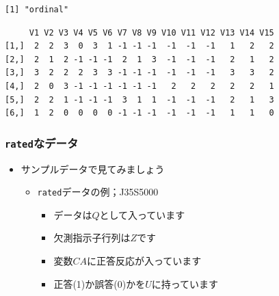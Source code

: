 \documentclass[
  a4paper,
]{ltjsbook}
\newenvironment{Shaded}{\begin{snugshade}}{\end{snugshade}}
\newcommand{\FunctionTok}[1]{\textcolor[rgb]{0.28,0.35,0.67}{#1}}
\newcommand{\NormalTok}[1]{\textcolor[rgb]{0.00,0.23,0.31}{#1}}
\newcommand{\OtherTok}[1]{\textcolor[rgb]{0.00,0.23,0.31}{#1}}
\newcommand{\SpecialCharTok}[1]{\textcolor[rgb]{0.37,0.37,0.37}{#1}}
\providecommand{\tightlist}{%
  \setlength{\itemsep}{0pt}\setlength{\parskip}{0pt}}\usepackage{longtable,booktabs,array}
\begin{document}
\begin{Shaded}
\end{Shaded}

\begin{verbatim}
[1] "ordinal"
\end{verbatim}

\begin{Shaded}
\end{Shaded}

\begin{verbatim}
     V1 V2 V3 V4 V5 V6 V7 V8 V9 V10 V11 V12 V13 V14 V15
[1,]  2  2  3  0  3  1 -1 -1 -1  -1  -1  -1   1   2   2
[2,]  2  1  2 -1 -1 -1  2  1  3  -1  -1  -1   2   1   2
[3,]  3  2  2  2  3  3 -1 -1 -1  -1  -1  -1   3   3   2
[4,]  2  0  3 -1 -1 -1 -1 -1 -1   2   2   2   2   2   1
[5,]  2  2  1 -1 -1 -1  3  1  1  -1  -1  -1   2   1   3
[6,]  1  2  0  0  0  0 -1 -1 -1  -1  -1  -1   1   1   0
\end{verbatim}

\subsubsection{\texorpdfstring{\texttt{rated}なデータ}{ratedなデータ}}\label{ratedux306aux30c7ux30fcux30bf}

\begin{itemize}
\tightlist
\item
  サンプルデータで見てみましょう

  \begin{itemize}
  \tightlist
  \item
    \texttt{rated}データの例；J35S5000

    \begin{itemize}
    \tightlist
    \item
      データは\(Q\)として入っています
    \item
      欠測指示子行列は\(Z\)です
    \item
      変数\(CA\)に正答反応が入っています
    \item
      正答(1)か誤答(0)かを\(U\)に持っています
    \end{itemize}
  \end{itemize}
\end{itemize}
\end{document}
